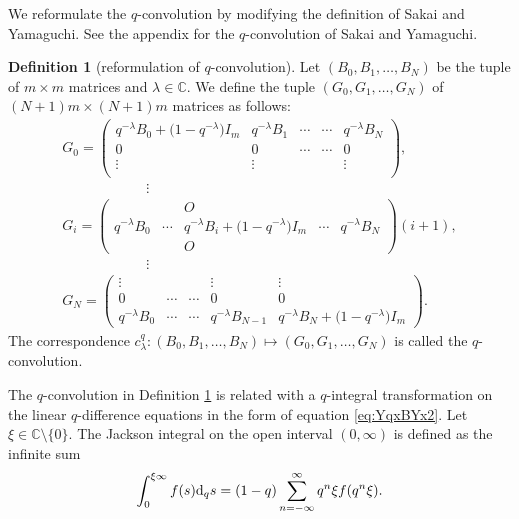 \documentclass[pdftex]{sigma}
\numberwithin{equation}{section}
\theoremstyle{definition}
\newtheorem{Definition}[Theorem]{Definition}
\begin{document}
We reformulate the $q$-convolution by modifying the definition of Sakai and Yamaguchi.
See the appendix for the $q$-convolution of Sakai and Yamaguchi.
\begin{Definition}[reformulation of $q$-convolution] \label{def:tqc}
Let $ ( B_{0}, B_{1} ,\dots ,B_N ) $ be the tuple of $m\times m $ matrices and $\lambda \in \mathbb{C} $.
We define the tuple $( G_0, G_1, \dots , G_N )$ of $(N+1)m \times (N+1)m$ matrices as follows:
\begin{gather}
 G_0 = \left(
 \begin{matrix}
 q^{-\lambda } B_0 + \bigl(1-q^{-\lambda}\bigr)I_m & q^{-\lambda }B_1 & \cdots & \cdots & q^{-\lambda } B_N \\
 0 & 0 & \cdots & \cdots & 0 \\
 \vdots & \vdots & {} & {} & \vdots \\
 \end{matrix}
\right), \nonumber\\
 \qquad \qquad \qquad \vdots \nonumber\\
 G_i = \left(
 \begin{matrix}
 {} & {} & O & {} & {} \\
 q^{-\lambda } B_0 & \cdots & q^{-\lambda }B_i + \bigl(1-q^{-\lambda}\bigr)I_m & \cdots & q^{-\lambda } B_N \\
 {} & {} & O & {} & {}
 \end{matrix}
\right)
 {\scriptstyle (i+1)}, \nonumber\\
 \qquad \qquad \qquad \vdots\nonumber \\
 G_N = \left(
 \begin{matrix}
 \vdots & {} & {} & \vdots & \vdots \\
 0 & \cdots & \cdots & 0 & 0 \\
 q^{-\lambda } B_0 & \cdots & \cdots & q^{-\lambda }B_{N-1} & q^{-\lambda } B_N + \bigl(1-q^{-\lambda}\bigr)I_m
 \end{matrix}
\right).  \label{eq:bG}
\end{gather}
The correspondence $c ^q _\lambda\colon( B_{0}, B_{1} ,\dots ,B_N ) \mapsto ( G_0, G_1, \dots , G_N )$ is called the $q$-convolution.
\end{Definition}
The $q$-convolution in Definition \ref{def:tqc} is related with a $q$-integral transformation on the linear $q$-difference equations in the form of equation \eqref{eq:YqxBYx2}.
Let $\xi \in \mathbb{C} \setminus \{ 0 \}$.
The Jackson integral on the open interval $(0,\infty )$ is defined as the infinite sum
\begin{equation*}
 \int^{\xi \infty }_{0}f(s) {\rm d}_{q}s = (1-q)\sum^{\infty}_{n=-\infty}q^{n} \xi f(q^n \xi ).
\end{equation*}
\end{document}

